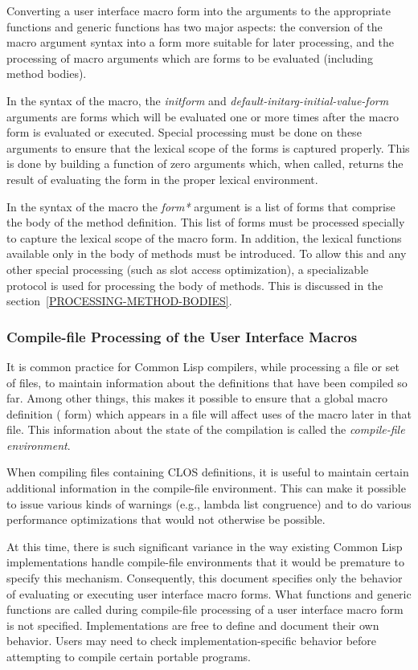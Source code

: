 Converting a user interface macro form into the arguments to the appropriate
functions and generic functions has two major aspects: the conversion of the
macro argument syntax into a form more suitable for later processing, and the
processing of macro arguments which are forms to be evaluated (including method
bodies). 

In the syntax of the  macro, the \emph{initform} and
\emph{default-initarg-initial-value-form} arguments are forms which will be evaluated
one or more times after the macro form is evaluated or executed. Special
processing must be done on these arguments to ensure that the lexical scope of
the forms is captured properly. This is done by building a function of zero
arguments which, when called, returns the result of evaluating the form in the
proper lexical environment. 

In the syntax of the  macro the \emph{form*} argument is a list of forms that
comprise the body of the method definition. This list of forms must be processed
specially to capture the lexical scope of the macro form. In addition, the
lexical functions available only in the body of methods must be introduced. To
allow this and any other special processing (such as slot access optimization),
a specializable protocol is used for processing the body of methods. This is
discussed in the section~\ref{PROCESSING-METHOD-BODIES}.

\subsubsection{Compile-file Processing of the User Interface Macros}

It is common practice for Common Lisp compilers, while processing a file or set
of files, to maintain information about the definitions that have been compiled
so far. Among other things, this makes it possible to ensure that a global macro
definition ( form) which appears in a file will affect uses of the
macro 
later in that file. This information about the state of the compilation is
called the \emph{compile-file environment}. 

When compiling files containing CLOS definitions, it is useful to maintain
certain additional information in the compile-file environment. This can make it
possible to issue various kinds of warnings (e.g., lambda list congruence) and
to do various performance optimizations that would not otherwise be possible. 

At this time, there is such significant variance in the way existing Common Lisp
implementations handle compile-file environments that it would be premature to
specify this mechanism. Consequently, this document specifies only the behavior
of evaluating or executing user interface macro forms. What functions and
generic functions are called during compile-file processing of a user interface
macro form is not specified. Implementations are free to define and document
their own behavior. Users may need to check implementation-specific behavior
before attempting to compile certain portable programs.

